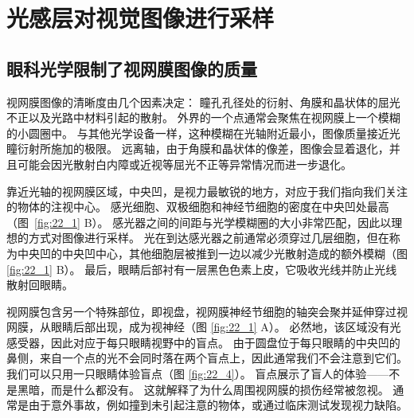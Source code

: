 \section{光感层对视觉图像进行采样}

\subsection{眼科光学限制了视网膜图像的质量}

视网膜图像的清晰度由几个因素决定：
瞳孔孔径处的衍射、角膜和晶状体的屈光不正以及光路中材料引起的散射。
外界的一个点通常会聚焦在视网膜上一个模糊的小圆圈中。
与其他光学设备一样，这种模糊在光轴附近最小，图像质量接近光瞳衍射所施加的极限。
远离轴，由于角膜和晶状体的像差，图像会显着退化，并且可能会因光散射白内障或近视等屈光不正等异常情况而进一步退化。


靠近光轴的视网膜区域，中央凹，是视力最敏锐的地方，对应于我们指向我们关注的物体的注视中心。
感光细胞、双极细胞和神经节细胞的密度在中央凹处最高（图~\ref{fig:22_1} B）。 
感光器之间的间距与光学模糊圈的大小非常匹配，因此以理想的方式对图像进行采样。 
光在到达感光器之前通常必须穿过几层细胞，但在称为中央凹的中央凹中心，其他细胞层被推到一边以减少光散射造成的额外模糊（图 \ref{fig:22_1} B）。 
最后，眼睛后部衬有一层黑色色素上皮，它吸收光线并防止光线散射回眼睛。


视网膜包含另一个特殊部位，即视盘，视网膜神经节细胞的轴突会聚并延伸穿过视网膜，从眼睛后部出现，成为视神经（图 \ref{fig:22_1} A）。 
必然地，该区域没有光感受器，因此对应于每只眼睛视野中的盲点。 
由于圆盘位于每只眼睛的中央凹的鼻侧，来自一个点的光不会同时落在两个盲点上，因此通常我们不会注意到它们。 
我们可以只用一只眼睛体验盲点（图 \ref{fig:22_4}）。 
盲点展示了盲人的体验——不是黑暗，而是什么都没有。 
这就解释了为什么周围视网膜的损伤经常被忽视。 
通常是由于意外事故，例如撞到未引起注意的物体，或通过临床测试发现视力缺陷。

